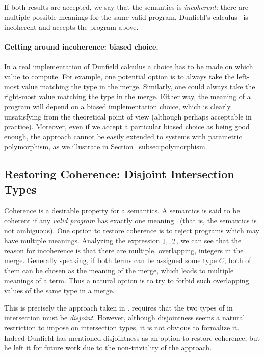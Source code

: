 If both results are accepted, we say that the semantics is
\emph{incoherent}: there are multiple possible meanings for the same
valid program. Dunfield's calculus~\cite{dunfield2014elaborating} is incoherent and accepts the
program above.

\paragraph{Getting around incoherence: biased choice.}
In a real implementation of Dunfield calculus a choice has to be made
on which value to compute. For example, one potential option is to
always take the left-most value matching the type in the
merge. Similarly, one could always take the right-most
value matching the type in the merge. Either way, the meaning
of a program will depend on a biased implementation choice,
which is clearly unsatisfying from the theoretical point of view
(although perhaps acceptable in practice).
Moreover, even if we accept a particular biased choice as
being good enough, the approach cannot be easily
extended to systems with parametric polymorphism, as we illustrate
in Section~\ref{subsec:polymorphism}.

\subsection{Restoring Coherence: Disjoint Intersection Types}\label{sec:restoring}
Coherence is a desirable property for a semantics. A semantics is said
to be coherent if any \emph{valid program} has exactly one
meaning~\cite{reynolds1991coherence} (that is, the semantics is not ambiguous).
One option to restore coherence is to reject programs which may have
multiple meanings.
Analyzing the expression $1 ,, 2$, we can see that the reason
for incoherence is that there are multiple, overlapping, integers in the
merge. Generally speaking, if both terms can be assigned some type $C$,
both of them can be chosen as the meaning of the merge,
which leads to multiple meanings of a term.
Thus a natural option is to try to forbid such overlapping
values of the same type in a merge.

This is precisely the approach taken in \namedis. \namedis requires that the
two types of in intersection must be \emph{disjoint}.  However,
although disjointness seems a natural restriction to impose on
intersection types, it is not obvious to formalize it. Indeed Dunfield
has mentioned disjointness as an option to restore coherence, but he
left it for future work due to the non-triviality of the approach.

